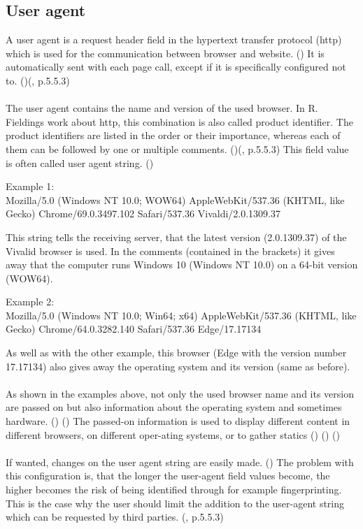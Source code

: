 \subsection{User agent}\label{UAS}
A user agent is a request header field in the hypertext transfer protocol (http) which is used for the communication between browser and website. (\textcite{xovi18}) It is automatically sent with each page call, except if it is specifically configured not to. (\textcite{xovi18})(\textcite{fielding14}, p.5.5.3)\\\\
The user agent contains the name and version of the used browser. In R. Fieldings work about http, this combination is also called product identifier. The product identifiers are listed in the order or their importance, whereas each of them can be followed by one or multiple comments. (\textcite{xovi18})(\textcite{fielding14}, p.5.5.3) This field value is often called user agent string. (\textcite{hoffman16})\\
\begin{tcolorbox}
Example 1: \\
Mozilla/5.0 (Windows NT 10.0; WOW64) AppleWebKit/537.36 (KHTML, like Gecko) Chrome/69.0.3497.102 Safari/537.36 Vivaldi/2.0.1309.37
\end{tcolorbox}
This string tells the receiving server, that the latest version (2.0.1309.37) of the Vivalid browser is used. In the comments (contained in the brackets) it gives away that the computer runs Windows 10 (Windows NT 10.0) on a 64-bit version (WOW64).\\
\begin{tcolorbox}
Example 2:\\
Mozilla/5.0 (Windows NT 10.0; Win64; x64) AppleWebKit/537.36 (KHTML, like Gecko) Chrome/64.0.3282.140 Safari/537.36 Edge/17.17134\\
\end{tcolorbox}
As well as with the other example, this browser (Edge with the version number 17.17134) also gives away the operating system and its version (same as before).\\\\
As shown in the examples above, not only the used browser name and its version are passed on but also information about the operating system and sometimes hardware. (\textcite{hoffman16}) (\textcite{xovi18}) The passed-on information is used to display different content in different browsers, on different oper-ating systems, or to gather statics (\textcite{hoffman16}) (\textcite{arntz17}) (\textcite{xovi18})\\\\
If wanted, changes on the user agent string are easily made. (\textcite{arntz17})
The problem with this configuration is, that the longer the user-agent field values become, the higher becomes the risk of being identified through for example fingerprinting. This is the case why the user should limit the addition to the user-agent string which can be requested by third parties. (\textcite{fielding14}, p.5.5.3)

